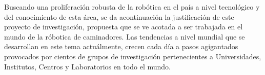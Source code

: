 {\begin{frame}[label=motivacion]
\begin{columns}[T,totalwidth=0.97\textwidth]
\begin{column}{0.4\textwidth}
{{\begin{center}
\begin{itemize}
              \end{itemize}
            \end{center}
          }
        }
      \end{column}
    \end{columns}
  \end{frame}
}
Buscando una proliferaci\'on robusta de la rob\'otica en el pa\'is a nivel tecnol\'ogico y del conocimiento de esta \'area, se da acontinuaci\'on la justificaci\'on de este proyecto de investigaci\'on, propuesta que se ve acotada a ser trabajada en el mundo de la r\'obotica de caminadores.  Las tendencias a nivel mundial que se desarrollan en este tema actu\'almente, crecen cada d\'ia a pasos agigantados provocados por cientos de grupos de investigaci\'on pertenecientes a Universidades, Institutos, Centros y Laboratorios en todo el mundo.\par
